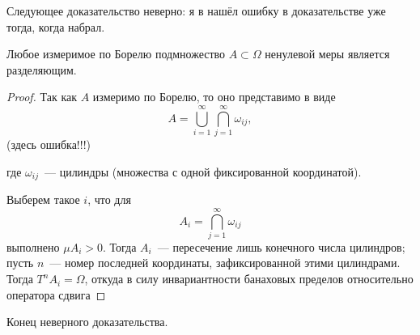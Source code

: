 
Следующее доказательство неверно: я в нашёл ошибку в доказательстве уже тогда, когда набрал.

\begin{theorem}
	Любое измеримое по Борелю подмножество $A\subset \Omega$ ненулевой меры является разделяющим.
\end{theorem}

\begin{proof}
	Так как $A$ измеримо по Борелю, то оно представимо в виде
	\begin{equation}
		A = \bigcup_{i=1}^\infty  \bigcap_{j=1}^\infty \omega_{ij}
		,
	\end{equation}
	(здесь ошибка!!!)

	где $\omega_{ij}$~--- цилиндры (множества с одной фиксированной координатой).

	Выберем такое $i$, что для
	\begin{equation}
		A_i = \bigcap_{j=1}^\infty \omega_{ij}
	\end{equation}
	выполнено $\mu A_i > 0$.
	Тогда $A_i$~--- пересечение лишь конечного числа цилиндров;
	пусть $n$~--- номер последней координаты, зафиксированной этими цилиндрами.
	Тогда $T^n A_i = \Omega$,
	откуда в силу инвариантности банаховых пределов относительно оператора сдвига
\end{proof}

Конец неверного доказательства.
